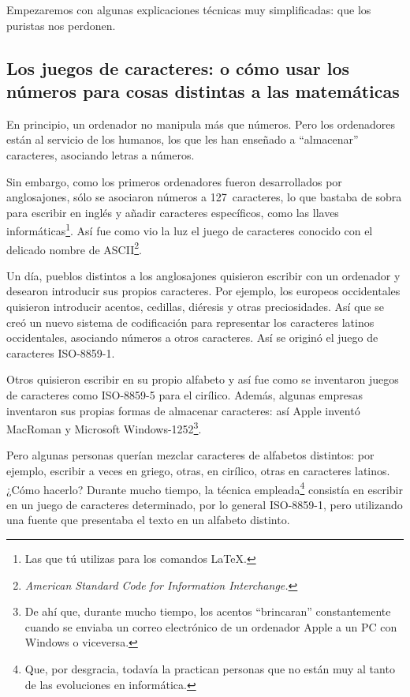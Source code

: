 Empezaremos con algunas explicaciones técnicas muy simplificadas: que los puristas nos perdonen.

\subsection{Los juegos de caracteres: o cómo usar los números para cosas distintas a las matemáticas}

En principio, un ordenador no manipula más que números. Pero los ordenadores están al servicio de los humanos, los que les han enseñado a \enquote{almacenar} caracteres, asociando letras a números.

Sin embargo, como los primeros ordenadores fueron desarrollados por anglosajones, sólo se asociaron números a 127~caracteres, lo que bastaba de sobra para escribir en inglés y añadir caracteres específicos, como las llaves informáticas\footnote{Las que tú utilizas para los comandos \LaTeX.}.  Así fue como vio la luz el juego de caracteres conocido con el delicado nombre de ASCII\footnote{\emph{\textenglish{American Standard Code for Information Interchange.}}}.

Un día, pueblos distintos a los anglosajones quisieron escribir con un ordenador y desearon introducir sus propios caracteres. Por ejemplo, los europeos occidentales quisieron introducir acentos, cedillas, diéresis y otras preciosidades. Así que se creó un nuevo sistema de codificación para representar los caracteres latinos occidentales, asociando números a otros caracteres. Así se originó el juego de caracteres  ISO-8859-1. 

Otros quisieron escribir en su propio alfabeto y así fue como se inventaron juegos de caracteres como ISO-8859-5 para el cirílico. Además, algunas empresas inventaron sus propias formas de almacenar caracteres:  así Apple inventó MacRoman y Microsoft Windows-1252\footnote{De ahí que, durante mucho tiempo, los acentos \enquote{brincaran} constantemente cuando se enviaba un correo electrónico de un ordenador Apple a un PC con Windows o viceversa.}. 

Pero algunas personas querían mezclar caracteres de alfabetos distintos: por ejemplo, escribir a veces en griego, otras, en cirílico, otras en caracteres latinos. ¿Cómo hacerlo? Durante mucho tiempo, la técnica empleada\footnote{Que, por desgracia, todavía la practican personas que no están muy al tanto de las evoluciones en informática.} consistía en escribir en un juego de caracteres determinado, por lo general ISO-8859-1, pero utilizando una fuente que presentaba el texto en un alfabeto distinto. 


